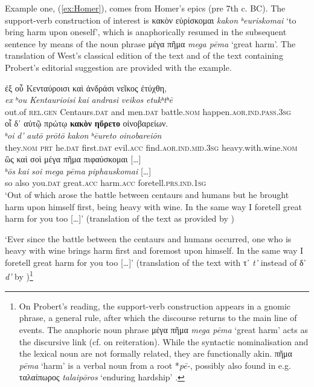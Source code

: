 \documentclass[output=paper,colorlinks,citecolor=brown]{langscibook}
\begin{document}
Example one, (\ref{ex:Homer}), comes from Homer’s epics (pre 7th c. BC). The support-verb construction of interest is κακὸν εὑρίσκομαι \textit{kakon ʰeuriskomai} ‘to bring harm upon oneself', which is anaphorically resumed in the subsequent sentence by means of the noun phrase μέγα πῆμα \textit{mega pēma} ‘great harm’. The translation of West’s classical edition of the text and of the text containing Probert's editorial suggestion are provided with the example.


\ea\label{ex:Homer}
\glll ἐξ οὗ Κενταύροισι καὶ ἀνδράσι νεῖκος ἐτύχθη, \\
\textit{ex} \textit{ʰou} \textit{Kentaurioisi} \textit{kai} \textit{andrasi} \textit{veikos} \textit{etukʰtʰē} \\
    out.of \textsc{rel}.\textsc{gen} Centaurs.\textsc{dat} and men.\textsc{dat} battle.\textsc{nom} happen.\textsc{aor.ind.pass.3sg} \\
\glll οἷ δ᾽ αὐτῷ πρώτῳ \textbf{κακὸν} \textbf{ηὕρετο} οἰνοβαρείων. \\
\textit{ʰoi} \textit{d’} \textit{autō} \textit{prōtō} \textit{kakon} \textit{ʰēureto} \textit{oinobareiōn} \\
    they.\textsc{nom} \textsc{prt} he.\textsc{dat} first.\textsc{dat} evil.\textsc{acc} find.\textsc{aor.ind.mid.3sg} heavy.with.wine.\textsc{nom} \\
\glll ὣς καὶ σοὶ μέγα πῆμα πιφαύσκομαι […] \\
\textit{ʰōs} \textit{kai} \textit{soi} \textit{mega} \textit{pēma} \textit{piphauskomai} […] \\
    so also you.\textsc{dat} great.\textsc{acc} harm.\textsc{acc} foretell.\textsc{prs.ind.1sg} \\
\glt ‘Out of which arose the battle between centaurs and humans 
but he brought harm upon himself first, being heavy with wine.
In the same way I foretell great harm for you too […]’ (translation of the text as provided by \citealt[447–448]{West2017})


‘Ever since the battle between the centaurs and humans occurred, 
one who is heavy with wine brings harm first and foremost upon himself.
In the same way I foretell great harm for you too […]’ (translation of the text with τ᾽ \textit{t'} instead of δ᾽ \textit{d'} by \citealt{probertExOuKentayroisi2023})\footnote{On Probert’s reading, the support-verb construction appears in a gnomic phrase, a general rule, after which the discourse returns to the main line of events. The anaphoric noun phrase μέγα πῆμα \textit{mega pēma} ‘great harm' acts as the discursive link (cf. \citealt[278]{hallidayCohesionEnglish1976} on reiteration). While the syntactic nominalisation and the lexical noun are not formally related, they are functionally akin. πῆμα \textit{pēma} ‘harm' is a verbal noun from a root *\textit{pē-}, possibly also found in e.g. ταλαίπωρος \textit{talaipōros} ‘enduring hardship' \citep{beekesEtymologicalDictionaryGreek2010}.} \\
\end{document}

